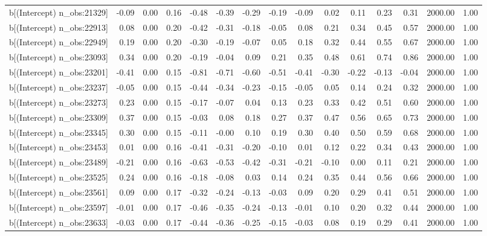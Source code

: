 \begin{table}[ht]
\begin{tabular}{rrrrrrrrrrrrrrr}
  b[(Intercept) n\_obs:21329] & -0.09 & 0.00 & 0.16 & -0.48 & -0.39 & -0.29 & -0.19 & -0.09 & 0.02 & 0.11 & 0.23 & 0.31 & 2000.00 & 1.00 \\ 
  b[(Intercept) n\_obs:22913] & 0.08 & 0.00 & 0.20 & -0.42 & -0.31 & -0.18 & -0.05 & 0.08 & 0.21 & 0.34 & 0.45 & 0.57 & 2000.00 & 1.00 \\ 
  b[(Intercept) n\_obs:22949] & 0.19 & 0.00 & 0.20 & -0.30 & -0.19 & -0.07 & 0.05 & 0.18 & 0.32 & 0.44 & 0.55 & 0.67 & 2000.00 & 1.00 \\ 
  b[(Intercept) n\_obs:23093] & 0.34 & 0.00 & 0.20 & -0.19 & -0.04 & 0.09 & 0.21 & 0.35 & 0.48 & 0.61 & 0.74 & 0.86 & 2000.00 & 1.00 \\ 
  b[(Intercept) n\_obs:23201] & -0.41 & 0.00 & 0.15 & -0.81 & -0.71 & -0.60 & -0.51 & -0.41 & -0.30 & -0.22 & -0.13 & -0.04 & 2000.00 & 1.00 \\ 
  b[(Intercept) n\_obs:23237] & -0.05 & 0.00 & 0.15 & -0.44 & -0.34 & -0.23 & -0.15 & -0.05 & 0.05 & 0.14 & 0.24 & 0.32 & 2000.00 & 1.00 \\ 
  b[(Intercept) n\_obs:23273] & 0.23 & 0.00 & 0.15 & -0.17 & -0.07 & 0.04 & 0.13 & 0.23 & 0.33 & 0.42 & 0.51 & 0.60 & 2000.00 & 1.00 \\ 
  b[(Intercept) n\_obs:23309] & 0.37 & 0.00 & 0.15 & -0.03 & 0.08 & 0.18 & 0.27 & 0.37 & 0.47 & 0.56 & 0.65 & 0.73 & 2000.00 & 1.00 \\ 
  b[(Intercept) n\_obs:23345] & 0.30 & 0.00 & 0.15 & -0.11 & -0.00 & 0.10 & 0.19 & 0.30 & 0.40 & 0.50 & 0.59 & 0.68 & 2000.00 & 1.00 \\ 
  b[(Intercept) n\_obs:23453] & 0.01 & 0.00 & 0.16 & -0.41 & -0.31 & -0.20 & -0.10 & 0.01 & 0.12 & 0.22 & 0.34 & 0.43 & 2000.00 & 1.00 \\ 
  b[(Intercept) n\_obs:23489] & -0.21 & 0.00 & 0.16 & -0.63 & -0.53 & -0.42 & -0.31 & -0.21 & -0.10 & 0.00 & 0.11 & 0.21 & 2000.00 & 1.00 \\ 
  b[(Intercept) n\_obs:23525] & 0.24 & 0.00 & 0.16 & -0.18 & -0.08 & 0.03 & 0.14 & 0.24 & 0.35 & 0.44 & 0.56 & 0.66 & 2000.00 & 1.00 \\ 
  b[(Intercept) n\_obs:23561] & 0.09 & 0.00 & 0.17 & -0.32 & -0.24 & -0.13 & -0.03 & 0.09 & 0.20 & 0.29 & 0.41 & 0.51 & 2000.00 & 1.00 \\ 
  b[(Intercept) n\_obs:23597] & -0.01 & 0.00 & 0.17 & -0.46 & -0.35 & -0.24 & -0.13 & -0.01 & 0.10 & 0.20 & 0.32 & 0.44 & 2000.00 & 1.00 \\ 
  b[(Intercept) n\_obs:23633] & -0.03 & 0.00 & 0.17 & -0.44 & -0.36 & -0.25 & -0.15 & -0.03 & 0.08 & 0.19 & 0.29 & 0.41 & 2000.00 & 1.00 \\ 

\end{tabular}
\end{table}
